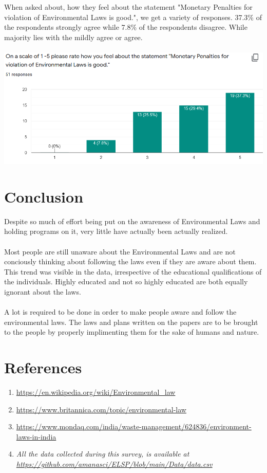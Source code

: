 \documentclass[12pt]{article}
\begin{document}
\\ \\
When asked about, how they feel about the statement "Monetary Penalties for violation of Environmental Laws is good.", we get a variety of responses. 
37.3\% of the respondents strongly agree while 7.8\% of the respondents disagree. While majority lies with the mildly agree or agree. 
\\ \\ 
\includegraphics[scale=0.7]{6}

\section{Conclusion}

Despite so much of effort being put on the awareness of Environmental Laws  
and holding programs on it, very little have actually been actually
realized.
\\ \\
\noindent
Most people are still unaware about the Environmental Laws and are not conciously thinking about following the laws even if they are aware about them. This trend was visible in the data, irrespective of the educational qualifications of the individuals. 
Highly educated and not so highly educated are both equally ignorant about the laws. 
\\ \\ 
\noindent
A lot is required to be done in order to make people aware and follow the environmental laws. The laws and plans written on the papers are to be brought to the people by properly implimenting them for the sake of humans and nature. 


\section{References}
\begin{enumerate}
    \item \url{https://en.wikipedia.org/wiki/Environmental_law}
    \item \url{https://www.britannica.com/topic/environmental-law}
    \item \url{https://www.mondaq.com/india/waste-management/624836/environment-laws-in-india}
    \item \emph{All the data collected during this survey, is available at \url{https://github.com/amanasci/ELSP/blob/main/Data/data.csv}}
\end{enumerate}
\end{document}
